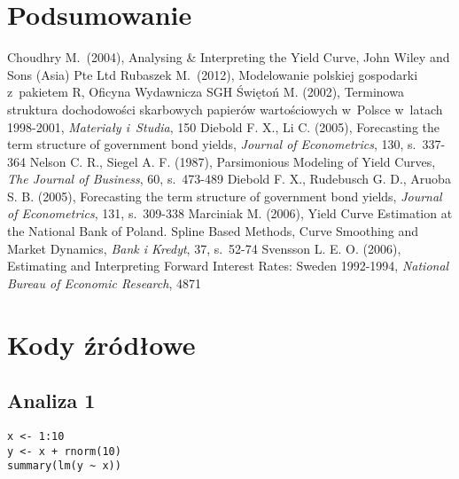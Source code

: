 \documentclass[12pt,a4paper,twoside,openany]{book}
\begin{document}
\clearpage

\chapter{Podsumowanie}



\clearpage
{}
\begin{thebibliography}{99}
\setlength{\itemsep}{0pt}%
 Choudhry M.~(2004), Analysing \& Interpreting the Yield Curve, John Wiley and Sons (Asia) Pte Ltd
 Rubaszek M.~(2012), Modelowanie polskiej gospodarki z~pakietem R, Oficyna Wydawnicza SGH
 Świętoń M. (2002), Terminowa struktura dochodowości skarbowych papierów wartościowych w~Polsce w~latach 1998-2001, \textit{Materiały i~Studia}, 150
 Diebold F. X., Li C. (2005), Forecasting the term structure of government bond yields, \textit{Journal of Econometrics}, 130, s.~337-364
 Nelson C. R., Siegel A. F. (1987), Parsimonious Modeling of Yield Curves, \textit{The Journal of Business}, 60, s.~473-489
 Diebold F. X., Rudebusch G. D., Aruoba S. B. (2005), Forecasting the term structure of government bond yields, \textit{Journal of Econometrics}, 131, s.~309-338
 Marciniak M. (2006), Yield Curve Estimation at the National Bank of Poland. Spline Based Methods, Curve Smoothing and Market Dynamics, \textit{Bank i Kredyt}, 37, s.~52-74
 Svensson L. E. O. (2006), Estimating and Interpreting Forward Interest Rates: Sweden 1992-1994, \textit{National Bureau of Economic Research}, 4871


\end{thebibliography}

\clearpage
{}
\listoffigures

\clearpage
\listoftables
{}

\appendix
\chapter*{Kody źródłowe}

\section*{Analiza 1}
\begin{verbatim}
x <- 1:10
y <- x + rnorm(10)
summary(lm(y ~ x))
\end{verbatim}
\end{document}
